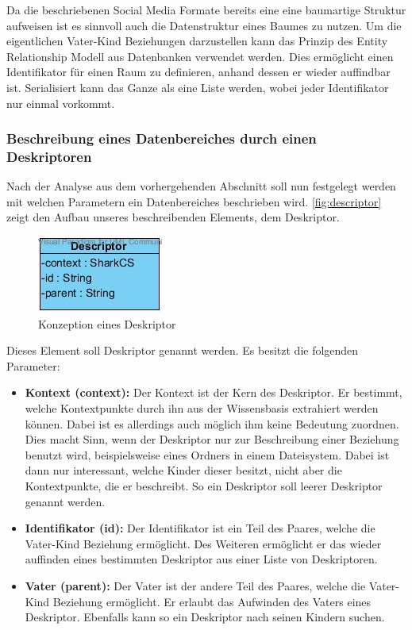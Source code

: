\documentclass[a4paper]{article}
\begin{document}
	Da die beschriebenen Social Media Formate bereits eine eine baumartige Struktur
	aufweisen ist es sinnvoll auch die Datenstruktur eines Baumes zu nutzen. Um
	die eigentlichen Vater-Kind Beziehungen darzustellen kann das Prinzip des
	Entity Relationship Modell aus Datenbanken verwendet werden. Dies ermöglicht
	einen Identifikator für einen Raum zu definieren, anhand dessen er wieder
	auffindbar ist. Serialisiert kann das Ganze als eine Liste werden, wobei
	jeder Identifikator nur einmal vorkommt.
	
	\subsubsection{Beschreibung eines Datenbereiches durch einen Deskriptoren}
	\label{sec:desk}
	
	Nach der Analyse aus dem vorhergehenden Abschnitt soll nun festgelegt werden
	mit welchen Parametern ein Datenbereiches beschrieben wird.
	\autoref{fig:descriptor} zeigt den Aufbau unseres beschreibenden Elements, dem
	Deskriptor.
	
	\begin{figure}[H] 
		\centerline{
			\includegraphics{../Bilder/descriptor.jpg}
		}
		\caption{Konzeption eines Deskriptor}
		\label{fig:descriptor}
	\end{figure}
	
	Dieses Element soll Deskriptor genannt werden. Es besitzt die folgenden
	Parameter:
	
	\begin{itemize}
		\item \textbf{Kontext (context):} Der Kontext ist der Kern des Deskriptor.
		Er bestimmt, welche Kontextpunkte durch ihn aus der Wissensbasis extrahiert
		werden können. Dabei ist es allerdings auch möglich ihm keine Bedeutung 
		zuordnen. Dies macht Sinn, wenn der Deskriptor nur zur Beschreibung einer
		Beziehung benutzt wird, beispielsweise eines Ordners in einem Dateisystem.
		Dabei ist dann nur interessant, welche Kinder dieser besitzt, nicht aber
		die Kontextpunkte, die er beschreibt. So ein Deskriptor soll leerer
		Deskriptor genannt werden.
		\item \textbf{Identifikator (id):} Der Identifikator ist ein Teil des
		Paares, welche die Vater-Kind Beziehung ermöglicht. Des Weiteren
		ermöglicht er das wieder auffinden eines bestimmten Deskriptor aus einer
		Liste von Deskriptoren.
		\item \textbf{Vater (parent):} Der Vater ist der andere Teil des Paares,
		welche die Vater-Kind Beziehung ermöglicht. Er erlaubt das Aufwinden des
		Vaters eines Deskriptor. Ebenfalls kann so ein Deskriptor nach seinen
		Kindern	suchen.
	\end{itemize} 	
	
\end{document}
